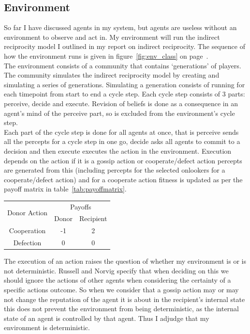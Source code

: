 \documentclass[twoside,twocolumn]{article}
\begin{document}
\subsection{Environment}
So far I have discussed agents in my system, but agents are useless without an environment to observe and act in. My environment will run the indirect reciprocity model I outlined in my report on indirect reciprocity. The sequence of how the environment runs is given in figure~\ref{fig:env_class} on page~\pageref{fig:env_class}.\\
The environment consists of a community that contains `generations' of players. The community simulates the indirect reciprocity model by creating and simulating a series of generations. Simulating a generation consists of running for each timepoint from start to end a cycle step. Each cycle step consists of 3 parts: perceive, decide and execute. Revision of beliefs is done as a consequence in an agent's mind of the perceive part, so is excluded from the environment's cycle step.\\
Each part of the cycle step is done for all agents at once, that is perceive sends all the percepts for a cycle step in one go, decide asks all agents to commit to a decision and then execute executes the action in the environment. Execution depends on the action if it is a gossip action or cooperate/defect action percepts are generated from this (including percepts for the selected onlookers for a cooperate/defect action) and for a cooperate action fitness is updated as per the payoff matrix in table~\ref{tab:payoffmatrix}.
\begin{framed}
	\begin{center}
		\begin{tabular}{c|c|c}
		\multirow{2}{*}{Donor Action} & \multicolumn{2}{c}{Payoffs}\\		
		& Donor & Recipient\\
		\hline
		Cooperation & -1 & 2\\
		\hline
		Defection & 0 & 0\\
		\end{tabular}
		\label{tab:payoffmatrix}
	\end{center}	
\end{framed}
\noindent The execution of an action raises the question of whether my environment is or is not deterministic. Russell and Norvig specify that when deciding on this we should ignore the actions of other agents when considering the certainty of a specific actions outcome. So when we consider that a gossip action may or may not change the reputation of the agent it is about in the recipient's internal state this does not prevent the environment from being deterministic, as the internal state of an agent is controlled by that agent. Thus I adjudge that my environment is deterministic.\\
\end{document}
